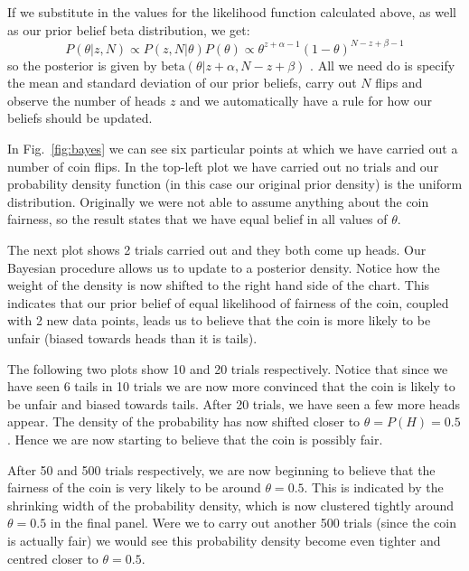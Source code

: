 If we substitute in the values for the likelihood function calculated above, as well as our prior belief beta distribution, we get:
\begin{equation}
  P(\theta|z,N)\propto P(z,N|\theta)P(\theta)\propto \theta^{z+\alpha - 1}(1-\theta)^{N-z+\beta -1} 
\end{equation}
so the posterior is given by $\textrm{beta}(\theta|z+\alpha,N-z+\beta)$ .
All we need do is specify the mean and standard deviation of our prior beliefs, carry out $N$ flips and observe the number of heads $z$ and we automatically have a rule for how our beliefs should be updated.

In Fig.~\ref{fig:bayes} we can see six particular points at which we have carried out a number of coin flips. In the top-left plot we have carried out no trials and our probability density function (in this case our original prior density) is the uniform distribution.
Originally we were not able to assume anything about the coin fairness, so the result states that we have equal belief in all values of $\theta$.

The next plot shows 2 trials carried out and they both come up heads. Our Bayesian procedure allows us to update to a posterior density. Notice how the weight of the density is now shifted to the right hand side of the chart. This indicates that our prior belief of equal likelihood of fairness of the coin, coupled with 2 new data points, leads us to believe that the coin is more likely to be unfair (biased towards heads than it is tails).

The following two plots show 10 and 20 trials respectively. Notice that since we have seen 6 tails in 10 trials we are now more convinced that the coin is likely to be unfair and biased towards tails. After 20 trials, we have seen a few more heads appear. The density of the probability has now shifted closer to $\theta = P(H) = 0.5$. Hence we are now starting to believe that the coin is possibly fair.

After 50 and 500 trials respectively, we are now beginning to believe that the fairness of the coin is very likely to be around $\theta=0.5$. This is indicated by the shrinking width of the probability density, which is now clustered tightly around $\theta=0.5$ in the final panel. Were we to carry out another 500 trials (since the coin is actually fair) we would see this probability density become even tighter and centred closer to $\theta=0.5$.

